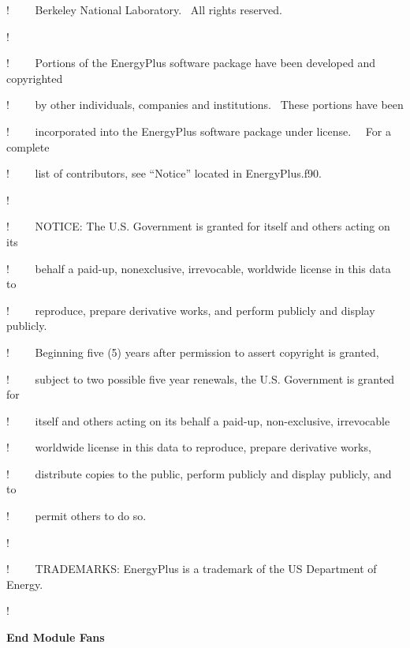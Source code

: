 !~~~~ Berkeley National Laboratory.~ All rights reserved.

!

!~~~~ Portions of the EnergyPlus software package have been developed and copyrighted

!~~~~ by other individuals, companies and institutions.~ These portions have been

!~~~~ incorporated into the EnergyPlus software package under license.~~ For a complete

!~~~~ list of contributors, see ``Notice'' located in EnergyPlus.f90.

!

!~~~~ NOTICE: The U.S. Government is granted for itself and others acting on its

!~~~~ behalf a paid-up, nonexclusive, irrevocable, worldwide license in this data to

!~~~~ reproduce, prepare derivative works, and perform publicly and display publicly.

!~~~~ Beginning five (5) years after permission to assert copyright is granted,

!~~~~ subject to two possible five year renewals, the U.S. Government is granted for

!~~~~ itself and others acting on its behalf a paid-up, non-exclusive, irrevocable

!~~~~ worldwide license in this data to reproduce, prepare derivative works,

!~~~~ distribute copies to the public, perform publicly and display publicly, and to

!~~~~ permit others to do so.

!

!~~~~ TRADEMARKS: EnergyPlus is a trademark of the US Department of Energy.

!

\textbf{End Module Fans}
